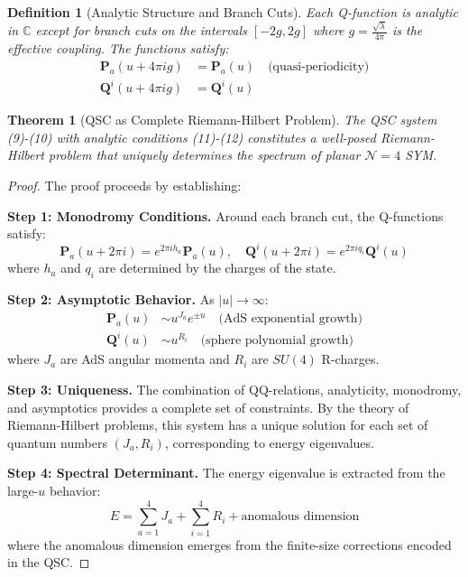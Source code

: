 \documentclass[11pt]{article}
\newtheorem{theorem}{Theorem}
\newtheorem{definition}{Definition}
\begin{document}
\begin{definition}[Analytic Structure and Branch Cuts]
Each Q-function is analytic in $\mathbb{C}$ except for branch cuts on the intervals $[-2g, 2g]$ where $g = \frac{\sqrt{\lambda}}{4\pi}$ is the effective coupling. The functions satisfy:
\begin{align}
\mathbf{P}_a(u + 4\pi i g) &= \mathbf{P}_a(u) \quad \text{(quasi-periodicity)} \\
\mathbf{Q}^i(u + 4\pi i g) &= \mathbf{Q}^i(u)
\end{align}
\end{definition}

\begin{theorem}[QSC as Complete Riemann-Hilbert Problem]
The QSC system (9)-(10) with analytic conditions (11)-(12) constitutes a well-posed Riemann-Hilbert problem that uniquely determines the spectrum of planar $\mathcal{N}=4$ SYM.
\end{theorem}

\begin{proof}
The proof proceeds by establishing:

\textbf{Step 1: Monodromy Conditions.} Around each branch cut, the Q-functions satisfy:
\begin{equation}
\mathbf{P}_a(u + 2\pi i) = e^{2\pi i h_a} \mathbf{P}_a(u), \quad \mathbf{Q}^i(u + 2\pi i) = e^{2\pi i q_i} \mathbf{Q}^i(u)
\end{equation}
where $h_a$ and $q_i$ are determined by the charges of the state.

\textbf{Step 2: Asymptotic Behavior.} As $|u| \to \infty$:
\begin{align}
\mathbf{P}_a(u) &\sim u^{J_a} e^{\pm u} \quad \text{(AdS exponential growth)} \\
\mathbf{Q}^i(u) &\sim u^{R_i} \quad \text{(sphere polynomial growth)}
\end{align}
where $J_a$ are AdS angular momenta and $R_i$ are $SU(4)$ R-charges.

\textbf{Step 3: Uniqueness.} The combination of QQ-relations, analyticity, monodromy, and asymptotics provides a complete set of constraints. By the theory of Riemann-Hilbert problems, this system has a unique solution for each set of quantum numbers $(J_a, R_i)$, corresponding to energy eigenvalues.

\textbf{Step 4: Spectral Determinant.} The energy eigenvalue is extracted from the large-$u$ behavior:
\begin{equation}
E = \sum_{a=1}^4 J_a + \sum_{i=1}^4 R_i + \text{anomalous dimension}
\end{equation}
where the anomalous dimension emerges from the finite-size corrections encoded in the QSC.
\end{proof}
\end{document}
